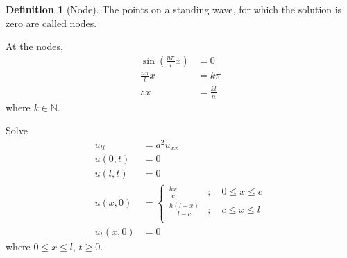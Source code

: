 \documentclass[titlepage, fleqn, a4paper, 12pt, twoside]{article}
\theoremstyle{definition}
\newtheorem{definition}{Definition}
\theoremstyle{theorem}
\begin{document}
\begin{definition}[Node]
	The points on a standing wave, for which the solution is zero are called nodes.
\end{definition}

At the nodes,
\begin{align*}
	\sin\left( \frac{n \pi}{l} x \right) & = 0     \\
	\frac{n \pi}{l} x                    & = k \pi \\
	\therefore x                         & = \frac{k l}{n}
\end{align*}
where $k \in \mathbb{N}$.

\begin{question}
	Solve
	\begin{align*}
		u_{t t} &= a^2 u_{x x}\\
		u(0,t) &= 0\\
		u(l,t) &= 0\\
		u(x,0) &=
			\begin{cases}
				\frac{h x}{c}           & ;\quad 0 \le x \le c \\
				\frac{h (l - x)}{l - c} & ;\quad c \le x \le l \\
			\end{cases}\\
		u_t(x,0) &= 0
	\end{align*}
	where $0 \le x \le l$, $t \ge 0$.
\end{question}
\end{document}
